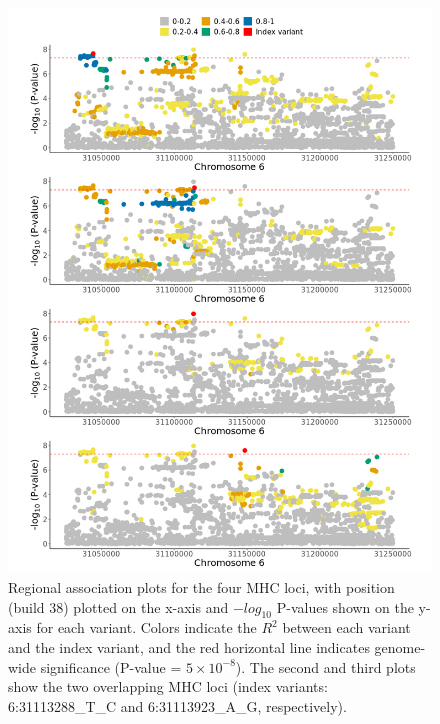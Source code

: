       \begin{figure}[H] 
        \centering    
        \includegraphics[width=1.0\textwidth]{Vector/ukbb_mhc_regional_assoc_plots.png}
        \caption[Regional association plots of pAD-associated MHC loci in the UKBB analysis]{Regional association plots for the four MHC loci, with position (build 38) plotted on the x-axis and $-log_{10}$ P-values shown on the y-axis for each variant. Colors indicate the $R^{2}$ between each variant and the index variant, and the red horizontal line indicates genome-wide significance (P-value = $5\times10^{-8}$). The second and third plots show the two overlapping MHC loci (index variants: 6:31113288\_T\_C and 6:31113923\_A\_G, respectively).}
        \label{fig:ukbb_mhc_regional_assoc_plots}
        \end{figure}

